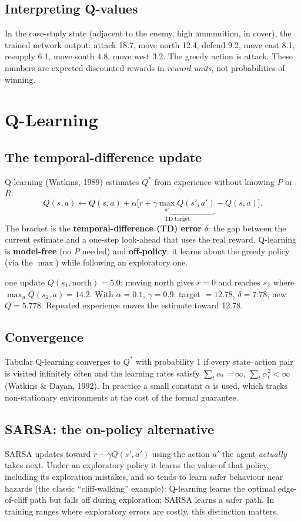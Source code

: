 \documentclass[11pt]{article}
\begin{document}
\subsection{Interpreting Q-values}
In the case-study state (adjacent to the enemy, high ammunition, in cover), the trained network output: attack 18.7, move north 12.4, defend 9.2, move east 8.1, resupply 6.1, move south 4.8, move west 3.2. The greedy action is attack. These numbers are expected discounted rewards in \emph{reward units}, not probabilities of winning.

\section{Q-Learning}
\subsection{The temporal-difference update}
Q-learning (Watkins, 1989) estimates $Q^*$ from experience without knowing $P$ or $R$:
\[Q(s,a)\leftarrow Q(s,a)+\alpha\big[\underbrace{r+\gamma\max_{a'}Q(s',a')}_{\text{TD target}}-Q(s,a)\big].\]
The bracket is the \textbf{temporal-difference (TD) error} $\delta$: the gap between the current estimate and a one-step look-ahead that uses the real reward. Q-learning is \textbf{model-free} (no $P$ needed) and \textbf{off-policy}: it learns about the greedy policy (via the $\max$) while following an exploratory one.
\begin{example}{one update}
$Q(s_1,\text{north})=5.0$; moving north gives $r=0$ and reaches $s_2$ where $\max_aQ(s_2,a)=14.2$. With $\alpha=0.1$, $\gamma=0.9$: target $=12.78$, $\delta=7.78$, new $Q=5.778$. Repeated experience moves the estimate toward 12.78.
\end{example}

\subsection{Convergence}
Tabular Q-learning converges to $Q^*$ with probability 1 if every state--action pair is visited infinitely often and the learning rates satisfy $\sum_t\alpha_t=\infty$, $\sum_t\alpha_t^2<\infty$ (Watkins \& Dayan, 1992). In practice a small constant $\alpha$ is used, which tracks non-stationary environments at the cost of the formal guarantee.

\subsection{SARSA: the on-policy alternative}
SARSA updates toward $r+\gamma Q(s',a')$ using the action $a'$ the agent \emph{actually} takes next. Under an exploratory policy it learns the value of that policy, including its exploration mistakes, and so tends to learn safer behaviour near hazards (the classic ``cliff-walking'' example): Q-learning learns the optimal edge-of-cliff path but falls off during exploration; SARSA learns a safer path. In training ranges where exploratory errors are costly, this distinction matters.
\end{document}
